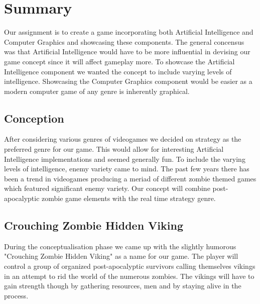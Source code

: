 \chapter{Summary}

Our assignment is to create a game incorporating both Artificial Intelligence and Computer Graphics and showcasing these components. The general concensus was that Artificial Intelligence would have to be more influential in devising our game concept since it will affect gameplay more. To showcase the Artificial Intelligence component we wanted the concept to include varying levels of intelligence. Showcasing the Computer Graphics component would be easier as a modern computer game of any genre is inherently graphical.

\section{Conception}

After considering various genres of videogames we decided on strategy as the preferred genre for our game. This would allow for interesting Artificial Intelligence implementations and seemed generally fun. To include the varying levels of intelligence, enemy variety came to mind. The past few years there has been a trend in videogames producing a meriad of different zombie themed games which featured significant enemy variety. Our concept will combine  post-apocalyptic zombie game  elements with the real time strategy genre.

\section{Crouching Zombie Hidden Viking}

During the conceptualisation phase we came up with the slightly humorous "Crouching Zombie Hidden Viking" as a name for our game. The player will control a group of organized post-apocalyptic survivors calling themselves vikings in an attempt to rid the world of the numerous zombies. The vikings will have to gain strength though by gathering resources, men and by staying alive in the process.


